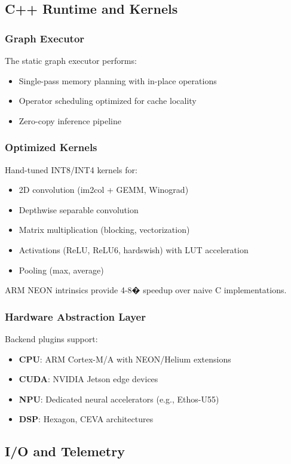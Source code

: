 \subsection{C++ Runtime and Kernels}

\subsubsection{Graph Executor}
The static graph executor performs:
\begin{itemize}
\item Single-pass memory planning with in-place operations
\item Operator scheduling optimized for cache locality
\item Zero-copy inference pipeline
\end{itemize}

\subsubsection{Optimized Kernels}
Hand-tuned INT8/INT4 kernels for:
\begin{itemize}
\item 2D convolution (im2col + GEMM, Winograd)
\item Depthwise separable convolution
\item Matrix multiplication (blocking, vectorization)
\item Activations (ReLU, ReLU6, hardswish) with LUT acceleration
\item Pooling (max, average)
\end{itemize}

ARM NEON intrinsics provide 4-8� speedup over naive C implementations.

\subsubsection{Hardware Abstraction Layer}
Backend plugins support:
\begin{itemize}
\item \textbf{CPU}: ARM Cortex-M/A with NEON/Helium extensions
\item \textbf{CUDA}: NVIDIA Jetson edge devices
\item \textbf{NPU}: Dedicated neural accelerators (e.g., Ethos-U55)
\item \textbf{DSP}: Hexagon, CEVA architectures
\end{itemize}

\subsection{I/O and Telemetry}

